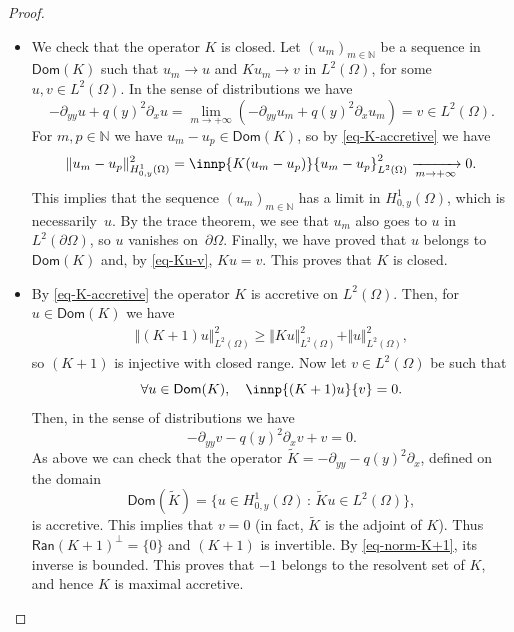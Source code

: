 \documentclass[10pt]{amsart}
\theoremstyle{plain}
\theoremstyle{definition}
\newcommand {\limt}[2]{\xrightarrow[#1 \to #2]{}}
\newcommand{\nr}[1]{\Vert #1\Vert}
\newcommand{\set}[1]{\{ #1\}}
\newcommand{\1}{\mathds 1}
\newcommand{\st}{\,:\,}
\let\Re\relax
\DeclareMathOperator{\Re}{\mathsf{Re}\mkern2mu}
\newcommand{\Dom}{\mathsf{Dom}}
\newcommand{\Ran}{\mathsf{Ran}}
\newcommand{\N}{\mathbb{N}}
\let\O\Omega
\begin{document}
\begin{proof}
\begin{itemize}
\item
We check that the operator $K$ is closed. Let $(u_m)_{m \in \N}$ be a sequence in $\Dom(K)$ such that $u_m \to u$ and $K u_m \to v$ in $L^2(\O)$, for some $u,v \in L^2(\O)$. In the sense of distributions we have
\begin{equation} \label{eq-Ku-v}
-\partial_{yy} u + q(y)^2 \partial_x u = \lim_{m \to +\infty} \left(-\partial_{yy} u_m + q(y)^2 \partial_x u_m \right) = v \in L^2(\O).
\end{equation}
For $m,p \in \N$ we have $u_m - u_p \in \Dom(K)$, so by \eqref{eq-K-accretive} we have
\begin{align*}
\nr{u_m - u_p}_{H^1_{0,y}(\O)}^2
= \Re \innp{K (u_m-u_p)}{u_m-u_p}_{L^2(\O)}^2
\limt m {+\infty} 0.
\end{align*}
This implies that the sequence $(u_m)_{m \in \N}$ has a limit in $H^1_{0,y}(\O)$, which is necessarily~$u$. By the trace theorem, we see that $u_m$ also goes to $u$ in $L^2(\partial\O)$, so $u$ vanishes on~$\partial \O$. Finally, we have proved that $u$ belongs to $\Dom(K)$ and, by \eqref{eq-Ku-v}, $Ku = v$. This proves that $K$ is closed.

\item
By \eqref{eq-K-accretive} the operator $K$ is accretive on $L^2(\O)$. Then, for $u \in \Dom(K)$ we have 
\begin{equation} \label{eq-norm-K+1}
\begin{aligned}
\nr{(K+1)u}_{L^2(\O)}^2 \geq \nr{Ku}_{L^2(\O)}^2 + \nr{u}_{L^2(\O)}^2,
\end{aligned}
\end{equation}
so $(K+1)$ is injective with closed range. Now let $v \in L^2(\O)$ be such that
\[
\forall u \in \Dom(K), \quad \innp{(K+1)u}{v} = 0.
\]
Then, in the sense of distributions we have
\[
-\partial_{yy} v - q(y)^2 \partial_x v + v = 0.
\]
As above we can check that the operator $\tilde K = -\partial_{yy} - q(y)^2 \partial_x$, defined on the domain
\[
\Dom(\tilde K) = \set{u \in H^1_{0,y}(\O) \st \tilde K u \in L^2(\O)},
\]
is accretive. This implies that $v = 0$ (in fact, $\tilde K$ is the adjoint of $K$). Thus \hbox{$\Ran(K+1)^\bot = \{0\}$} and $(K+1)$ is invertible. By \eqref{eq-norm-K+1}, its inverse is bounded. This proves that $-1$ belongs to the resolvent set of $K$, and hence $K$ is maximal accretive.\qedhere
\end{itemize}
\end{proof}
\end{document}
